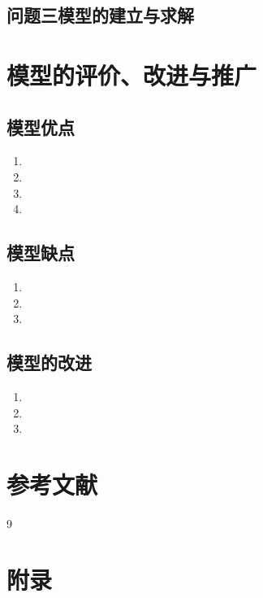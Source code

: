 \documentclass[a4paper]{article}
\begin{document}
\subsection{问题三模型的建立与求解}
	\section{模型的评价、改进与推广}
	\subsection{模型优点}
	\begin{enumerate}
		\item 
		\item 
		\item 
		\item 
	\end{enumerate}
	
	\subsection{模型缺点}
	\begin{enumerate}
		\item 
		\item 
		\item 
	\end{enumerate}
	
	\subsection{模型的改进}
	\begin{enumerate}
		\item 
		\item 
		\item 
	\end{enumerate}
	
	\section{参考文献}
	\vspace{-2em} %
	\begin{thebibliography}{9}  
	\end{thebibliography}
	
	\newpage
	\section*{附录}
	
\end{document}
